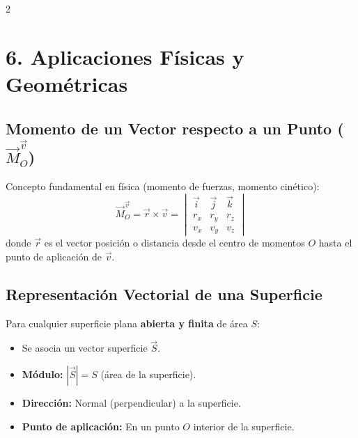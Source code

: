 \documentclass[9pt,a4paper]{article}
\begin{document}
\begin{multicols}{2}
\section{6. Aplicaciones Físicas y Geométricas}
\subsection{Momento de un Vector respecto a un Punto ($\vec{M}_O^{\vec{v}}$)}
Concepto fundamental en física (momento de fuerzas, momento cinético):
$$\vec{M}_O^{\vec{v}} = \vec{r} \times \vec{v} = \begin{vmatrix} \vec{i} & \vec{j} & \vec{k} \\ r_x & r_y & r_z \\ v_x & v_y & v_z \end{vmatrix}$$
donde $\vec{r}$ es el vector posición o distancia desde el centro de momentos $O$ hasta el punto de aplicación de $\vec{v}$.

\subsection{Representación Vectorial de una Superficie}
Para cualquier superficie plana \textbf{abierta y finita} de área $S$:
\begin{itemize}
    \item Se asocia un vector superficie $\vec{S}$.
    \item \textbf{Módulo:} $|\vec{S}| = S$ (área de la superficie).
    \item \textbf{Dirección:} Normal (perpendicular) a la superficie.
    \item \textbf{Punto de aplicación:} En un punto $O$ interior de la superficie.
\end{itemize}

\end{multicols}
\end{document}
